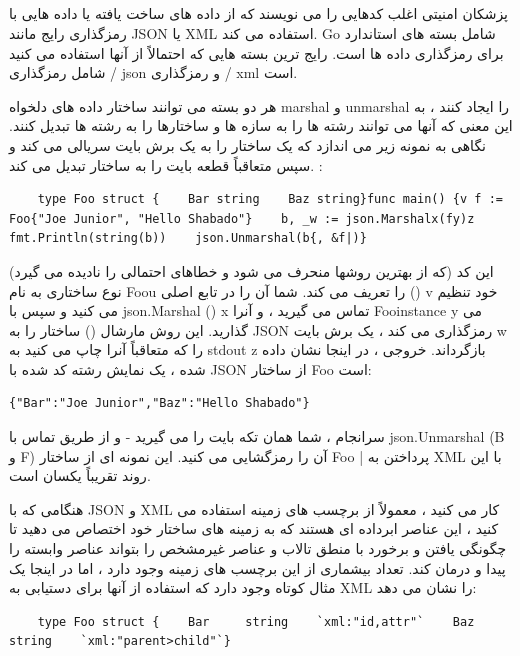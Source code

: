 \documentclass[12pt]{book}
\begin{document}
\subsection{}
پزشکان امنیتی اغلب کدهایی را می نویسند که از داده های ساخت یافته یا داده هایی با رمزگذاری رایج مانند JSON یا XML استفاده می کند. Go شامل بسته های استاندارد برای رمزگذاری داده ها است. رایج ترین بسته هایی که احتمالاً از آنها استفاده می کنید شامل رمزگذاری / json و رمزگذاری / xml است.

هر دو بسته می توانند ساختار داده های دلخواه marshal و unmarshal را ایجاد کنند ، به این معنی که آنها می توانند رشته ها را به سازه ها و ساختارها را به رشته ها تبدیل کنند. نگاهی به نمونه زیر می اندازد که یک ساختار را به یک برش بایت سریالی می کند و سپس متعاقباً قطعه بایت را به ساختار تبدیل می کند. :
\begin{latin}
	\begin{lstlisting}
	type Foo struct {    Bar string    Baz string}func main() {v f := Foo{"Joe Junior", "Hello Shabado"}    b, _w := json.Marshalx(fy)z fmt.Println(string(b))    json.Unmarshal(b{, &f|)}
	\end{lstlisting}
\end{latin}

این کد (که از بهترین روشها منحرف می شود و خطاهای احتمالی را نادیده می گیرد) نوع ساختاری به نام Foou را تعریف می کند. شما آن را در تابع اصلی () v خود تنظیم می کنید و سپس با json.Marshal () x تماس می گیرید ، و آنرا Fooinstance y می گذارید. این روش مارشال () ساختار را به JSON رمزگذاری می کند ، یک برش بایت w را که متعاقباً آنرا چاپ می کنید به stdout z بازگرداند. خروجی ، در اینجا نشان داده شده ، یک نمایش رشته کد شده با JSON از ساختار Foo است:
\begin{latin}
	\begin{lstlisting}
{"Bar":"Joe Junior","Baz":"Hello Shabado"}
	\end{lstlisting}
\end{latin}

سرانجام ، شما همان تکه بایت را می گیرید - و از طریق تماس با json.Unmarshal (B و F) آن را رمزگشایی می کنید. این نمونه ای از ساختار Foo | پرداختن به XML با این روند تقریباً یکسان است.

هنگامی که با JSON و XML کار می کنید ، معمولاً از برچسب های زمینه استفاده می کنید ، این عناصر ابرداده ای هستند که به زمینه های ساختار خود اختصاص می دهید تا چگونگی یافتن و برخورد با منطق تالاب و عناصر غیرمشخص را بتواند عناصر وابسته را پیدا و درمان کند. تعداد بیشماری از این برچسب های زمینه وجود دارد ، اما در اینجا یک مثال کوتاه وجود دارد که استفاده از آنها برای دستیابی به XML را نشان می دهد:
\begin{latin}
	\begin{lstlisting}
	type Foo struct {    Bar     string    `xml:"id,attr"`    Baz     string    `xml:"parent>child"`}
	\end{lstlisting}
\end{latin}
\end{document}

